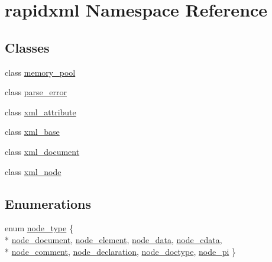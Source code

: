 \hypertarget{namespacerapidxml}{\section{rapidxml Namespace Reference}
\label{namespacerapidxml}
}
\subsection*{Classes}
\begin{DoxyCompactItemize}
\item 
class \hyperlink{classrapidxml_1_1memory__pool}{memory\+\_\+pool}
\item 
class \hyperlink{classrapidxml_1_1parse__error}{parse\+\_\+error}
\item 
class \hyperlink{singletonrapidxml_1_1xml__attribute}{xml\+\_\+attribute}
\item 
class \hyperlink{classrapidxml_1_1xml__base}{xml\+\_\+base}
\item 
class \hyperlink{singletonrapidxml_1_1xml__document}{xml\+\_\+document}
\item 
class \hyperlink{singletonrapidxml_1_1xml__node}{xml\+\_\+node}
\end{DoxyCompactItemize}
\subsection*{Enumerations}
\begin{DoxyCompactItemize}
\item 
enum \hyperlink{namespacerapidxml_abb456db38f7efb746c4330eed6072a7c}{node\+\_\+type} \{ \\*
\hyperlink{namespacerapidxml_abb456db38f7efb746c4330eed6072a7ca4023b6a1c7059fd8fbec2112d5c35424}{node\+\_\+document}, 
\hyperlink{namespacerapidxml_abb456db38f7efb746c4330eed6072a7ca89cbeb4d28046326e4ee953d3c4047ff}{node\+\_\+element}, 
\hyperlink{namespacerapidxml_abb456db38f7efb746c4330eed6072a7ca9d669d8e1f4ba9c7eeada4c14a11ad1d}{node\+\_\+data}, 
\hyperlink{namespacerapidxml_abb456db38f7efb746c4330eed6072a7caccf0b363d3876a3f83ff9b1bcdaaa536}{node\+\_\+cdata}, 
\\*
\hyperlink{namespacerapidxml_abb456db38f7efb746c4330eed6072a7ca1a695e1384ec3bd4df3eff65ec609a96}{node\+\_\+comment}, 
\hyperlink{namespacerapidxml_abb456db38f7efb746c4330eed6072a7cafe4ca44261e5fbedf0eab43131751212}{node\+\_\+declaration}, 
\hyperlink{namespacerapidxml_abb456db38f7efb746c4330eed6072a7cadf5002f2efabe231bed01d16f08f832c}{node\+\_\+doctype}, 
\hyperlink{namespacerapidxml_abb456db38f7efb746c4330eed6072a7caeb73b472e77347b9aa89525f16493b87}{node\+\_\+pi}
 \}
\end{DoxyCompactItemize}
